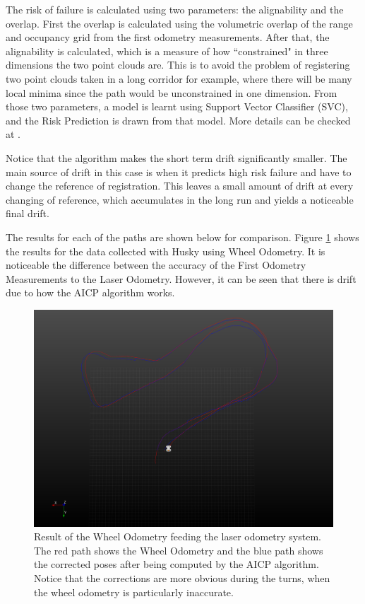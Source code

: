 \documentclass[12pt]{article}
\begin{document}
The risk of failure is calculated using two parameters: the alignability and the overlap. First the overlap is calculated using the volumetric overlap of the range and occupancy grid from the first odometry measurements. After that, the alignability is calculated, which is a measure of how ``constrained" in three dimensions the two point clouds are. This is to avoid the problem of registering two point clouds taken in a long corridor for example, where there will be many local minima since the path would be unconstrained in one dimension. From those two parameters, a model is learnt using Support Vector Classifier (SVC), and the Risk Prediction is drawn from that model. More details can be checked at \cite{AICPAlign}.
	
Notice that the algorithm makes the short term drift significantly smaller. The main source of drift in this case is when it predicts high risk failure and have to change the reference of registration. This leaves a small amount of drift at every changing of reference, which accumulates in the long run and yields a noticeable final drift.
	
The results for each of the paths are shown below for comparison. Figure \ref{fig:LaserOdometry1} shows the results for the data collected with Husky using Wheel Odometry. It is noticeable the difference between the accuracy of the First Odometry Measurements to the Laser Odometry. However, it can be seen that there is drift due to how the AICP algorithm works.

\begin{figure}
\begin{minipage}{0.65\textwidth}
\centering
\includegraphics[width=\textwidth]{LaserOdometry1}
\end{minipage} \hfill
\begin{minipage}{0.35\textwidth}
\centering
\caption[t]{Result of the Wheel Odometry feeding the laser odometry system. The red path shows the Wheel Odometry and the blue path shows the corrected poses after being computed by the AICP algorithm. Notice that the corrections are more obvious during the turns, when the wheel odometry is particularly inaccurate.}
\label{fig:LaserOdometry1}	
\end{minipage}				
\end{figure}
\end{document}
